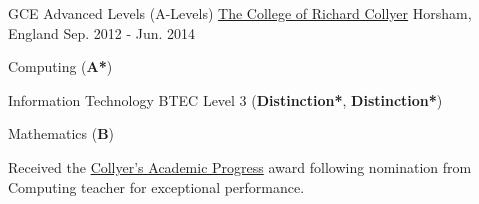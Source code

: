 \begin{cventries}
  \cventry
    {GCE Advanced Levels (A-Levels)}
    {\href{https://www.collyers.ac.uk/}{The College of Richard Collyer}}
    {Horsham, England}
    {Sep. 2012 - Jun. 2014}
    {
      \begin{cvitems}
        \item {Computing (\textbf{A*})}
        \item {Information Technology BTEC Level 3 (\textbf{Distinction*}, \textbf{Distinction*})}
        \item {Mathematics (\textbf{B})}
        \item {Received the \href{https://www.westsussextoday.co.uk/news/outstanding-students-recognised-at-collyer-s-1-6481659}{Collyer's Academic Progress} award following nomination from Computing teacher for exceptional performance.}
      \end{cvitems}
    }
    {}
\end{cventries}
